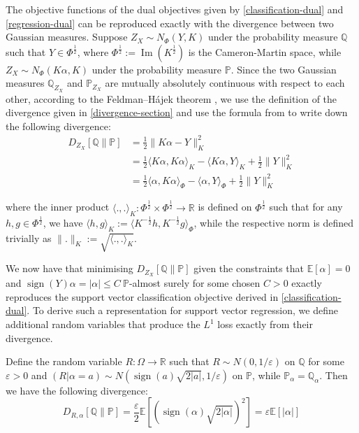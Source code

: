 \documentclass{article}
\begin{document}
The objective functions of the dual objectives given by \ref{classification-dual} and \ref{regression-dual} can be reproduced exactly with the divergence between two Gaussian measures. Suppose $Z_X \sim N_{\Phi} (Y , K)$ under the probability measure $\mathbb{Q}$ such that $Y \in \Phi^{\frac{1}{2}}$, where $\Phi^{\frac{1}{2}} := \operatorname{Im}(K^{\frac{1}{2}})$ is the Cameron-Martin space, while $Z_X \sim N_{\Phi} (K \alpha , K)$ under the probability measure $\mathbb{P}$. Since the two Gaussian measures $\mathbb{Q}_{Z_X}$ and $\mathbb{P}_{Z_X}$ are mutually absolutely continuous with respect to each other, according to the Feldman–Hájek theorem \cite[Theorem 2.23]{Da_Prato_Zabczyk_1992}, we use the definition of the divergence given in \ref{divergence-section} and use the formula from \cite[Theorem 12]{quang2019regularizeddivergencescovarianceoperators} to write down the following divergence:
\begin{align}\label{divergence-svm}
D_{Z_X}[\mathbb{Q}\|\mathbb{P}] & = \frac{1}{2}\| K \alpha - Y\|_K^2 \\
 & = \frac{1}{2} \langle K \alpha , K \alpha \rangle_K - \langle K \alpha , Y \rangle_K + \frac{1}{2}\| Y\|_K^2 \\
 & = \frac{1}{2} \langle \alpha , K \alpha \rangle_{\Phi} - \langle \alpha , Y \rangle_{\Phi} + \frac{1}{2}\| Y\|_K^2
\end{align}

where the inner product $\langle . , . \rangle_K : \Phi^{\frac{1}{2}} \times \Phi^{\frac{1}{2}} \rightarrow \mathbb{R}$ is defined on $\Phi^{\frac{1}{2}}$ such that for any $h , g \in \Phi^{\frac{1}{2}}$, we have $\langle h , g \rangle_K := \langle K^{-\frac{1}{2}} h , K^{-\frac{1}{2}} g \rangle_{\Phi}$, while the respective norm is defined trivially as $\| .\|_K := \sqrt{\langle . , .\rangle_K}$.

We now have that minimising $D_{Z_X}\left[\mathbb{Q}\|\mathbb{P}\right]$ given the constraints that $\mathbb{E}\left[\alpha\right] = 0$ and $\operatorname{sign}\left(Y\right) \alpha = |\alpha | \leq C \ \mathbb{P}$-almost surely for some chosen $C > 0$ exactly reproduces the support vector classification objective derived in \ref{classification-dual}. To derive such a representation for support vector regression, we define additional random variables that produce the $L^1$ loss exactly from their divergence.

Define the random variable $R : \Omega \rightarrow \mathbb{R}$ such that $R \sim N(0 ,1/\varepsilon)$ on $\mathbb{Q}$ for some $\varepsilon > 0$ and $(R |\alpha = a) \sim N(\operatorname{sign}(a)\sqrt{2 | a |} ,1/\varepsilon)$ on $\mathbb{P}$, while $\mathbb{P}_{\alpha} = \mathbb{Q}_{\alpha}$. Then we have the following divergence:
\begin{equation}
D_{R ,\alpha}[\mathbb{Q}\|\mathbb{P}] = \frac{\varepsilon}{2}\mathbb{E}\left[\left(\operatorname{sign}(\alpha)\sqrt{2 |\alpha |}\right)^2\right] = \varepsilon \mathbb{E}[|\alpha |]
\end{equation}
\end{document}
